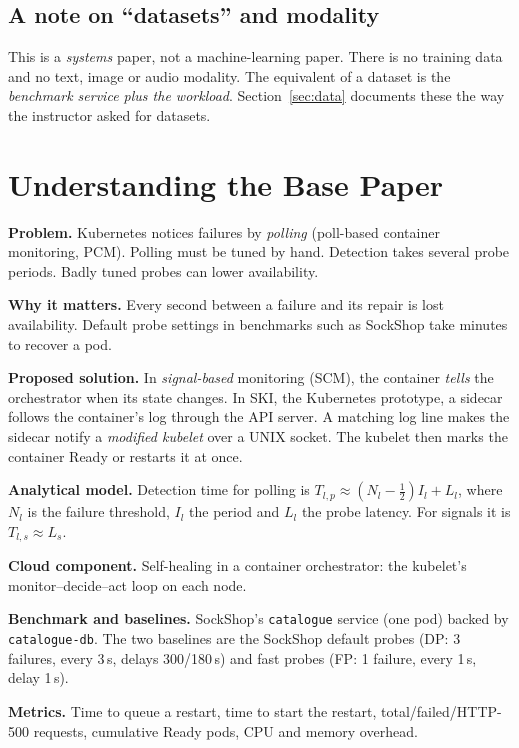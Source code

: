 \documentclass[conference]{IEEEtran}
\begin{document}
\subsection{A note on ``datasets'' and modality}
This is a \emph{systems} paper, not a machine-learning paper. There is
no training data and no text, image or audio modality. The equivalent of
a dataset is the \emph{benchmark service plus the workload}.
Section~\ref{sec:data} documents these the way the instructor asked for
datasets.

\section{Understanding the Base Paper}
\label{sec:understand}
\textbf{Problem.} Kubernetes notices failures by \emph{polling}
(poll-based container monitoring, PCM). Polling must be tuned by hand.
Detection takes several probe periods. Badly tuned probes can lower
availability.

\textbf{Why it matters.} Every second between a failure and its repair
is lost availability. Default probe settings in benchmarks such as
SockShop take minutes to recover a pod.

\textbf{Proposed solution.} In \emph{signal-based} monitoring (SCM), the
container \emph{tells} the orchestrator when its state changes. In SKI,
the Kubernetes prototype, a sidecar follows the container's log through
the API server. A matching log line makes the sidecar notify a
\emph{modified kubelet} over a UNIX socket. The kubelet then marks the
container Ready or restarts it at once.

\textbf{Analytical model.} Detection time for polling is
$T_{l,p}\approx (N_l-\tfrac12)I_l+L_l$, where $N_l$ is the failure
threshold, $I_l$ the period and $L_l$ the probe latency. For signals
it is $T_{l,s}\approx L_s$.

\textbf{Cloud component.} Self-healing in a container orchestrator: the
kubelet's monitor--decide--act loop on each node.

\textbf{Benchmark and baselines.} SockShop's \texttt{catalogue} service
(one pod) backed by \texttt{catalogue-db}. The two baselines are the
SockShop default probes (DP: 3 failures, every 3\,s, delays 300/180\,s)
and fast probes (FP: 1 failure, every 1\,s, delay 1\,s).

\textbf{Metrics.} Time to queue a restart, time to start the restart,
total/failed/HTTP-500 requests, cumulative Ready pods, CPU and memory
overhead.
\end{document}

